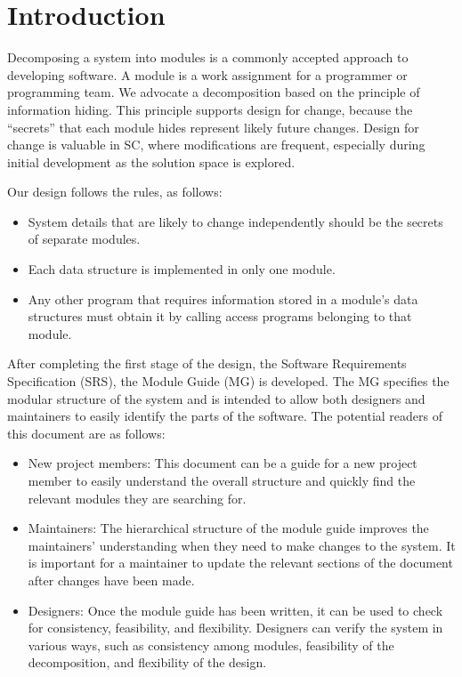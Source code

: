 \documentclass[12pt, titlepage]{article}
\begin{document}
\newpage

\tableofcontents

\listoftables

\listoffigures

\newpage


\section{Introduction}

Decomposing a system into modules is a commonly accepted approach to developing
software.  A module is a work assignment for a programmer or programming team.
We advocate a decomposition based on the principle of information hiding.  This
principle supports design for change, because the ``secrets'' that each module
hides represent likely future changes.  Design for change is valuable in SC,
where modifications are frequent, especially during initial development as the
solution space is explored.  

Our design follows the rules, as follows:
\begin{itemize}
\item System details that are likely to change independently should be the
  secrets of separate modules.
\item Each data structure is implemented in only one module.
\item Any other program that requires information stored in a module's data
  structures must obtain it by calling access programs belonging to that module.
\end{itemize}

After completing the first stage of the design, the Software Requirements
Specification (SRS), the Module Guide (MG) is developed. The MG specifies the
modular structure of the system and is intended to allow both designers and
maintainers to easily identify the parts of the software.  The potential readers
of this document are as follows:

\begin{itemize}
\item New project members: This document can be a guide for a new project member
  to easily understand the overall structure and quickly find the relevant
  modules they are searching for.
\item Maintainers: The hierarchical structure of the module guide improves the
  maintainers' understanding when they need to make changes to the system. It is
  important for a maintainer to update the relevant sections of the document
  after changes have been made.
\item Designers: Once the module guide has been written, it can be used to check
  for consistency, feasibility, and flexibility. Designers can verify the system
  in various ways, such as consistency among modules, feasibility of the
  decomposition, and flexibility of the design.
\end{itemize}
\end{document}
